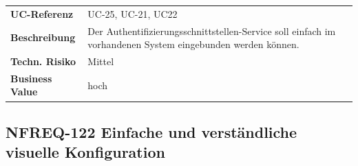 \begin{longtable}[c]{@{}ll@{}}
\toprule
\begin{minipage}[t]{0.20\columnwidth}\raggedright\strut
\textbf{UC-Referenz}
\strut\end{minipage} &
\begin{minipage}[t]{0.74\columnwidth}\raggedright\strut
UC-25, UC-21, UC22
\strut\end{minipage}\tabularnewline
\begin{minipage}[t]{0.20\columnwidth}\raggedright\strut
\textbf{Beschreibung}
\strut\end{minipage} &
\begin{minipage}[t]{0.74\columnwidth}\raggedright\strut
Der Authentifizierungsschnittstellen-Service soll einfach im vorhandenen
System eingebunden werden können.
\strut\end{minipage}\tabularnewline
\begin{minipage}[t]{0.20\columnwidth}\raggedright\strut
\textbf{Techn. Risiko}
\strut\end{minipage} &
\begin{minipage}[t]{0.74\columnwidth}\raggedright\strut
Mittel
\strut\end{minipage}\tabularnewline
\begin{minipage}[t]{0.20\columnwidth}\raggedright\strut
\textbf{Business Value}
\strut\end{minipage} &
\begin{minipage}[t]{0.74\columnwidth}\raggedright\strut
hoch
\strut\end{minipage}\tabularnewline
\bottomrule
\end{longtable}

\subsection{NFREQ-122 Einfache und verständliche visuelle
Konfiguration}\label{nfreq-122-einfache-und-verstuxe4ndliche-visuelle-konfiguration}

